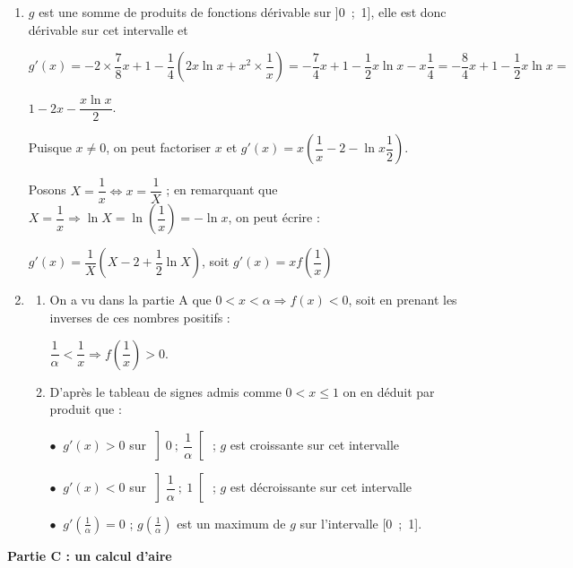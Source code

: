 \begin{enumerate}
\item $g$ est une somme de produits de fonctions dérivable sur ]0~;~1], elle est donc dérivable sur cet intervalle et 

$g'(x) = - 2 \times \dfrac78 x + 1 - \dfrac14\left(2x \ln x + x^2 \times \dfrac 1x \right) = 
- \dfrac74 x + 1 - \dfrac12 x \ln x - x\dfrac14 = - \dfrac84 x + 1 - \dfrac 1 2 x \ln x =$

$  1 - 2x - \dfrac{x\ln x}{2}$.

Puisque $x \ne 0$, on peut factoriser $x$ et $g'(x) = x\left(\dfrac 1x - 2 - \ln x\dfrac12 \right)$.

Posons $X = \dfrac 1x \iff x = \dfrac 1X$ ; en remarquant que $X = \dfrac 1x \Rightarrow \ln X = \ln \left(\dfrac 1x\right) = - \ln x$, on peut écrire :

$g'(x) = \dfrac 1X \left(X - 2 + \dfrac12 \ln X \right)$, soit $g'(x) = xf\left(\dfrac 1x \right)$
\item 
	\begin{enumerate}
		\item On a vu dans la partie A que $0 < x < \alpha \Rightarrow f(x) < 0$, soit en prenant les inverses de ces nombres positifs :
		
$ \dfrac{1}{\alpha} <  \dfrac 1x \Rightarrow f\left(\dfrac 1x \right) > 0$.
		\item D'après le tableau de signes admis comme $0< x \leqslant 1$ on en déduit par produit que :
		
$\bullet~$ $g'(x) > 0$ sur $\left]0~;~\dfrac{1}{\alpha}\right[$ ; $g$ est croissante sur cet intervalle

$\bullet~$ $g'(x) < 0$ sur $\left]\dfrac{1}{\alpha}~;~1\right[$ ; $g$ est décroissante sur cet intervalle

$\bullet~$ $g'\left(\frac{1}{\alpha}\right) = 0$ ; $g\left(\frac{1}{\alpha}\right)$ est un maximum de $g$ sur l'intervalle [0~;~1].
	\end{enumerate}
\end{enumerate}

\medskip

\textbf{Partie C : un calcul d'aire}

\medskip

